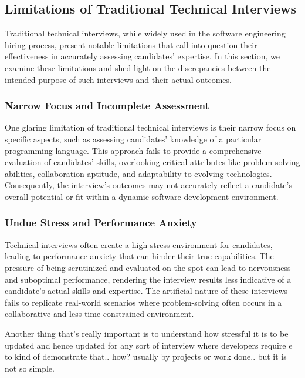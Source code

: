 \documentclass[
    a4paper, %
    10pt, %
    unnumberedsections, %
    twoside, %
]{LTJournalArticle}
\begin{document}
\subsection{Limitations of Traditional Technical Interviews}

Traditional technical interviews, while widely used in the software engineering hiring process, present notable limitations that call into question their effectiveness in accurately assessing candidates' expertise. In this section, we examine these limitations and shed light on the discrepancies between the intended purpose of such interviews and their actual outcomes.

\subsubsection*{Narrow Focus and Incomplete Assessment}

One glaring limitation of traditional technical interviews is their narrow focus on specific aspects, such as assessing candidates' knowledge of a particular programming language. This approach fails to provide a comprehensive evaluation of candidates' skills, overlooking critical attributes like problem-solving abilities, collaboration aptitude, and adaptability to evolving technologies. Consequently, the interview's outcomes may not accurately reflect a candidate's overall potential or fit within a dynamic software development environment.

\subsubsection*{Undue Stress and Performance Anxiety}

Technical interviews often create a high-stress environment for candidates, leading to performance anxiety that can hinder their true capabilities. The pressure of being scrutinized and evaluated on the spot can lead to nervousness and suboptimal performance, rendering the interview results less indicative of a candidate's actual skills and expertise. The artificial nature of these interviews fails to replicate real-world scenarios where problem-solving often occurs in a collaborative and less time-constrained environment.



Another thing that's really important is to understand how stressful it is to be updated and hence updated for any sort of interview where developers require e to kind of demonstrate that.. how? usually by projects or work done.. but it is not so simple.  
\end{document}

